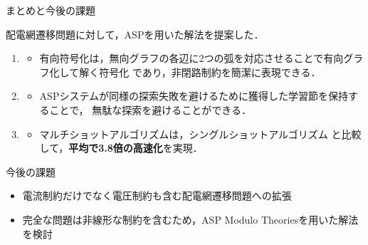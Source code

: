 \documentclass[dvipdfmx,11pt]{beamer}
\begin{document}
\begin{frame}{まとめと今後の課題}
 \begin{alertblock}{}
  \centering
  配電網遷移問題に対して，ASPを用いた解法を提案した．
 \end{alertblock}
 \vfill
  \begin{enumerate}
   \item {}
         \begin{itemize}
          \item 有向符号化は，無向グラフの各辺に2つの弧を対応させることで有向グラフ化して解く符号化
                であり，非閉路制約を簡潔に表現できる．
         \end{itemize}
   \item {}
         \begin{itemize}
          \item ASPシステムが同様の探索失敗を避けるために獲得した学習節を保持することで，
                無駄な探索を避けることができる．
         \end{itemize}
   \item {}
         \begin{itemize}
          \item マルチショットアルゴリズムは，シングルショットアルゴリズム
                と比較して，\textbf{平均で3.8倍の高速化}を実現．
         \end{itemize}
  \end{enumerate}
 \vfill
 \begin{exampleblock}{今後の課題}
\begin{itemize}
 \item 電流制約だけでなく電圧制約も含む配電網遷移問題への拡張
 \item 完全な問題は非線形な制約を含むため，ASP Modulo Theoriesを用いた解法を検討
\end{itemize}
 \end{exampleblock}
\end{frame}


%
\end{document}
